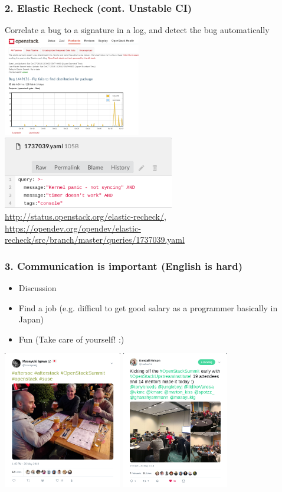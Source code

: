 \documentclass[aspectratio=169,11pt,hyperref={colorlinks=true}]{beamer}
\begin{document}
\begin{frame}
  \frametitle{2. Elastic Recheck (cont. Unstable CI)}
    Correlate a bug to a signature in a log, and detect the bug automatically
  \centering\includegraphics[width=60mm]{images/elastic-recheck.png}
  \centering\includegraphics[width=75mm]{images/elastic-recheck-source.png}
  \url{http://status.openstack.org/elastic-recheck/},
  \url{https://opendev.org/opendev/elastic-recheck/src/branch/master/queries/1737039.yaml}
\end{frame}

\begin{frame}
  \frametitle{3. Communication is important (English is hard)}
  \begin{itemize}
    \item Discussion
    \item Find a job (e.g. difficul to get good salary as a programmer basically in Japan)
    \item Fun (Take care of yourself! :)
  \end{itemize}
  \centering\includegraphics[height=60mm]{images/tweet-suse.png}
  \centering\includegraphics[height=60mm]{images/tweet-oui.png}
\end{frame}
\end{document}
